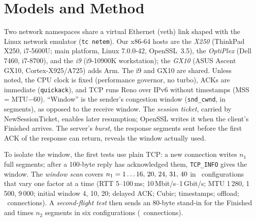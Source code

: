 \documentclass[sigconf,9pt,nonacm]{acmart}
\newcommand{\ms}{\,ms\xspace}
\begin{document}
\section{Models and Method}\label{sec:method}
Two network namespaces share a virtual Ethernet (veth) link shaped with the Linux network emulator (\texttt{tc netem}). Our x86-64 hosts are the \emph{X250} (ThinkPad X250, i7-5600U; main platform, Linux 7.0.0-42, OpenSSL~3.5), the \emph{OptiPlex} (Dell 7460, i7-8700), and the \emph{i9} (i9-10900K workstation); the \emph{GX10} (ASUS Ascent GX10, Cortex-X925/A725) adds Arm. The i9 and GX10 are shared. Unless noted, the CPU clock is fixed (performance governor, no turbo), ACKs are immediate (\texttt{quickack}), and TCP runs Reno over IPv6 without timestamps (MSS = MTU$-60$). ``Window'' is the sender's congestion window (\texttt{snd\_cwnd}, in segments), as opposed to the receive window. The \emph{session ticket}, carried by NewSessionTicket, enables later resumption; OpenSSL writes it when the client's Finished arrives. The server's \emph{burst}, the response segments sent before the first ACK of the response can return, reveals the window actually used.

To isolate the window, the first tests use plain TCP: a new connection writes $n_1$ full segments; after a 100-byte reply has acknowledged them, \texttt{TCP\_INFO} gives the window. The \emph{window scan} covers $n_1=1\ldots16,\,20,\,24,\,31,\,40$ in \NCfg\ configurations that vary one factor at a time (RTT 5--100\ms; 10\,Mbit/s--1\,Gbit/s; MTU 1\,280, 1\,500, 9\,000; initial window 4, 10, 20; delayed ACK; Cubic; timestamps; offload; \NStageA\ connections). A \emph{second-flight test} then sends an 80-byte stand-in for the Finished and times $n_2$ segments in six configurations (\NStageB\ connections).
\end{document}
